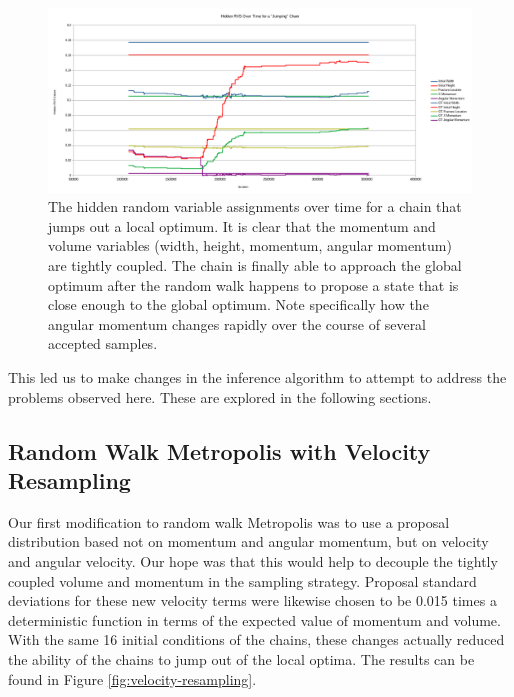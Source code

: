 \documentclass[runningheads]{llncs}
\begin{document}
\begin{figure}[t]
\begin{center}
   \includegraphics[width=0.8\linewidth]{figs/hidden_rvs_over_time.png}
\end{center}
   \caption{The hidden random variable assignments over time for a chain that 
        jumps out a local optimum. It is clear that the momentum and volume 
        variables (width, height, momentum, angular momentum) are tightly 
        coupled. The chain is finally able to approach the global optimum after 
        the random walk happens to propose a state that is close enough to the 
        global optimum. Note specifically how the angular momentum 
        changes rapidly over the course of several accepted samples.}
\label{fig:hidden_rvs_over_time}
\end{figure}

This led us to make changes in the inference algorithm to attempt to address 
the problems observed here. These are explored in the following sections.

\subsection{Random Walk Metropolis with Velocity Resampling}

Our first modification to random walk Metropolis was to use a proposal 
distribution based not on momentum and angular momentum, but on velocity and 
angular velocity. Our hope was that this would help to decouple the tightly 
coupled volume and momentum in the sampling strategy. Proposal standard 
deviations for these new velocity terms were likewise chosen to be 0.015 times a 
deterministic function in terms of the expected value of momentum and volume. 
With the same 16 initial conditions of the chains, these changes actually 
reduced the ability of the chains to jump out of the local optima. The 
results can be found in Figure \ref{fig:velocity-resampling}.
\end{document}
